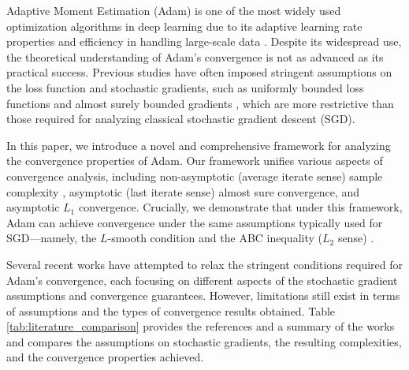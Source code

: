 \documentclass{article} %
\begin{document}


Adaptive Moment Estimation (Adam) is one of the most widely used optimization algorithms in deep learning due to its adaptive learning rate properties and efficiency in handling large-scale data \citep{kingma2014adam}. Despite its widespread use, the theoretical understanding of Adam's convergence is not as advanced as its practical success. Previous studies have often imposed stringent assumptions on the loss function and stochastic gradients, such as uniformly bounded loss functions and almost surely bounded gradients \citep{reddi2018convergence, zou2019improved}, which are more restrictive than those required for analyzing classical stochastic gradient descent (SGD).

In this paper, we introduce a novel and comprehensive framework for analyzing the convergence properties of Adam. Our framework unifies various aspects of convergence analysis, including non-asymptotic (average iterate sense) sample complexity%
, asymptotic (last iterate sense) almost sure convergence, and asymptotic \(L_1\) convergence. Crucially, we demonstrate that under this framework, Adam can achieve convergence under the same assumptions typically used for SGD—namely, the \(L\)-smooth condition and the ABC inequality (\(L_2\) sense) \citep{DBLP:journals/tmlr/KhaledR23,bottou2010large,ghadimi2013stochastic}.



Several recent works have attempted to relax the stringent conditions required for Adam's convergence, each focusing on different aspects of the stochastic gradient assumptions and convergence guarantees. However, limitations still exist in terms of assumptions and the types of convergence results obtained. Table \ref{tab:literature_comparison} provides the references and a summary of the works and compares the assumptions on stochastic gradients, the resulting complexities, and the convergence properties achieved. 
\end{document}
